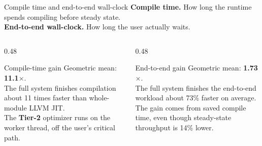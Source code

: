 \documentclass[aspectratio=169,11pt]{beamer}
\newcommand{\ttwo}{\textbf{\textcolor{tier2}{Tier-2}}}
\begin{document}
\begin{frame}{Compile time and end-to-end wall-clock}
  \textbf{Compile time.} How long the runtime spends compiling before steady state.\\
  \textbf{End-to-end wall-clock.} How long the user actually waits.

  \vspace{0.5em}
  \begin{columns}[T,onlytextwidth]
    \begin{column}{0.48\textwidth}
      \begin{block}{Compile-time gain}
        Geometric mean: \textbf{11.1$\times$}.\\
        The full system finishes compilation about 11 times faster than whole-module LLVM JIT.\\
        The \ttwo{} optimizer runs on the worker thread, off the user's critical path.
      \end{block}
    \end{column}
    \begin{column}{0.48\textwidth}
      \begin{block}{End-to-end gain}
        Geometric mean: \textbf{1.73$\times$}.\\
        The full system finishes the end-to-end workload about 73\% faster on average.\\
        The gain comes from saved compile time, even though steady-state throughput is 14\% lower.
      \end{block}
    \end{column}
  \end{columns}
\end{frame}
\end{document}
